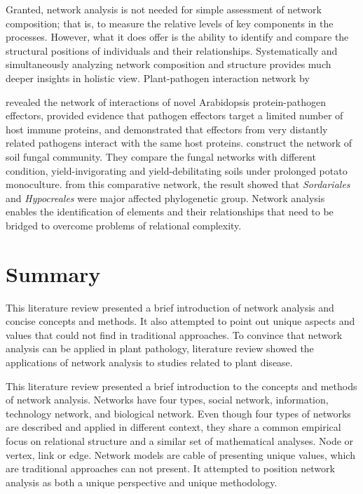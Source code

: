 Granted, network analysis is not needed for simple assessment of network composition; that is, to measure the relative levels of key components in the processes. However, what it does offer is the ability to identify and compare the structural positions of individuals and their relationships. Systematically and simultaneously analyzing network composition and structure provides much deeper insights in holistic view. Plant-pathogen interaction network by 

 revealed the network of interactions of novel Arabidopsis protein-pathogen effectors, provided evidence that pathogen effectors target a limited number of host immune proteins, and demonstrated that effectors from very distantly related pathogens interact with the same host proteins.  construct the network of soil fungal community. They compare the fungal networks with different condition, yield-invigorating and yield-debilitating soils under prolonged potato monoculture. from this comparative network, the result showed that \textit{Sordariales} and \textit{Hypocreales} were major affected phylogenetic group. Network analysis enables the identification of elements and their relationships that need to be bridged to overcome problems of relational complexity.

\section*{Summary}
This literature review presented a brief introduction of network analysis and concise concepts and methods. It also attempted to point out unique aspects and values that could not find in traditional approaches. To convince that network analysis can be applied in plant pathology, literature review showed the applications of network analysis to studies related to plant disease. 

This literature review presented a brief introduction to the concepts and methods of network analysis. Networks have four types, social network, information, technology network, and biological network. Even though four types of networks are described and applied in different context, they share a common empirical focus on relational structure and a similar set of mathematical analyses. Node or vertex, link or edge. Network models are cable of presenting unique values, which are traditional approaches can not present. It attempted to position network analysis as both a unique perspective and unique methodology.


